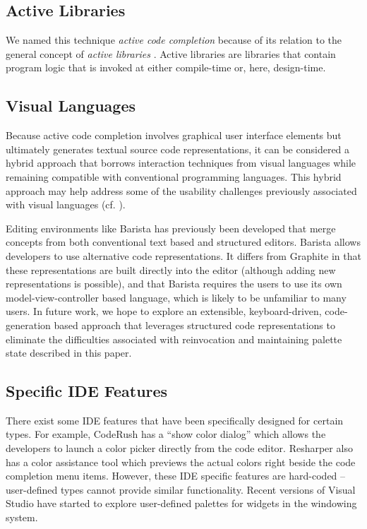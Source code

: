 \documentclass[10pt, conference, compsocconf]{IEEEtran}
\begin{document}
\subsection{Active Libraries}
We named this technique {\it active code completion} because of its relation to the general concept of {\it active libraries} \cite{activelibraries}. Active libraries are libraries that contain program logic that is invoked at either compile-time or, here, design-time. 

\subsection{Visual Languages}
Because active code completion involves graphical user interface elements but ultimately generates textual source code representations, it can be considered a hybrid approach that borrows interaction techniques from visual languages while remaining compatible with conventional programming languages. This hybrid approach may help address some of the usability challenges previously associated with visual languages (cf. \cite{oai:CiteSeerXPSU:10.1.1.110.3146}).

Editing environments like Barista \cite{Ko06} has previously been developed that merge concepts from both conventional text based and structured editors. Barista allows developers to use alternative code representations. It differs from Graphite in that these representations are built directly into the editor (although adding new representations is possible), and that Barista requires the users to use its own model-view-controller based language, which is likely to be unfamiliar to many users. In future work, we hope to explore an extensible, keyboard-driven, code-generation based approach that leverages structured code representations to eliminate the difficulties associated with reinvocation and maintaining palette state described in this paper.

\subsection{Specific IDE Features}
There exist some IDE features that have been specifically designed for certain types. For example, CodeRush has a ``show color dialog'' \cite{CodeRush} which allows the developers to launch a color picker directly from the code editor. Resharper \cite{Resharper} also has a color assistance tool which previews the actual colors right beside the code completion menu items. However, these IDE specific features are hard-coded -- user-defined types cannot provide similar functionality. Recent versions of Visual Studio have started to explore user-defined palettes for widgets in the windowing system.
\end{document}
